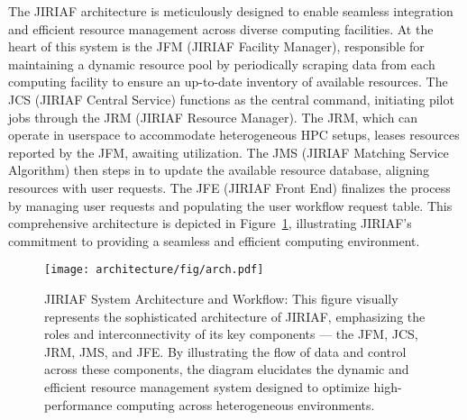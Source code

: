 The JIRIAF architecture is meticulously designed to enable seamless integration and efficient resource management across diverse computing facilities. At the heart of this system is the JFM (JIRIAF Facility Manager), responsible for maintaining a dynamic resource pool by periodically scraping data from each computing facility to ensure an up-to-date inventory of available resources. The JCS (JIRIAF Central Service) functions as the central command, initiating pilot jobs through the JRM (JIRIAF Resource Manager). The JRM, which can operate in userspace to accommodate heterogeneous HPC setups, leases resources reported by the JFM, awaiting utilization. The JMS (JIRIAF Matching Service Algorithm) then steps in to update the available resource database, aligning resources with user requests. The JFE (JIRIAF Front End) finalizes the process by managing user requests and populating the user workflow request table. This comprehensive architecture is depicted in Figure~\ref{arch}, illustrating JIRIAF's commitment to providing a seamless and efficient computing environment.

\begin{figure}[htbp]
\centerline{\texttt{[image: architecture/fig/arch.pdf]}}
\caption{JIRIAF System Architecture and Workflow: This figure visually represents the sophisticated architecture of JIRIAF, emphasizing the roles and interconnectivity of its key components — the JFM, JCS, JRM, JMS, and JFE. By illustrating the flow of data and control across these components, the diagram elucidates the dynamic and efficient resource management system designed to optimize high-performance computing across heterogeneous environments.}
\label{arch}
\end{figure}
\newpage

